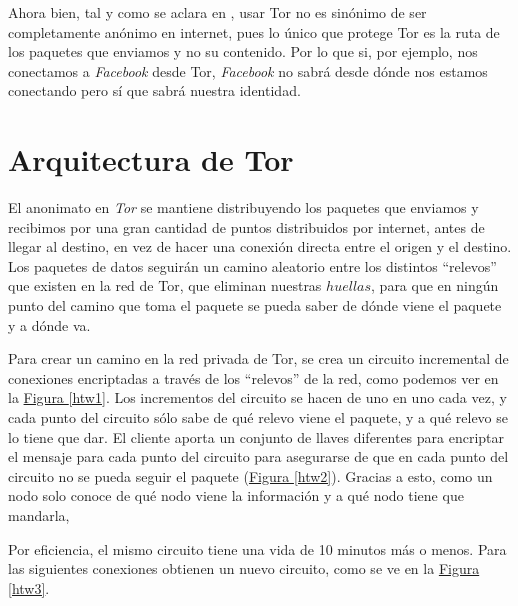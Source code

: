 \documentclass[10pt,a4paper,spanish]{article}
\begin{document}
Ahora bien, tal y como se aclara en \cite{anonymoustor}, usar Tor no es sinónimo de ser completamente anónimo en internet, pues lo único que protege Tor es la ruta de los paquetes que enviamos y no su contenido. Por lo que si, por ejemplo, nos conectamos a \textit{Facebook} desde Tor, \textit{Facebook} no sabrá desde dónde nos estamos conectando pero sí que sabrá nuestra identidad.

\section{Arquitectura de Tor}

El anonimato en \textit{Tor} se mantiene distribuyendo los paquetes que enviamos y recibimos por una gran cantidad de puntos distribuidos por internet, antes de llegar al destino, en vez de hacer una conexión directa entre el origen y el destino. Los paquetes de datos seguirán un camino aleatorio entre los distintos ``relevos'' que existen en la red de Tor, que eliminan nuestras $huellas$, para que en ningún punto del camino que toma el paquete se pueda saber de dónde viene el paquete y a dónde va.

Para crear un camino en la red privada de Tor, se crea un circuito incremental de conexiones encriptadas a través de los ``relevos'' de la red, como podemos ver en la \hyperref[htw1]{Figura \ref*{htw1}}. Los incrementos del circuito se hacen de uno en uno cada vez, y cada punto del circuito sólo sabe de qué relevo viene el paquete, y a qué relevo se lo tiene que dar. El cliente aporta un conjunto de llaves diferentes para encriptar el mensaje para cada punto del circuito para asegurarse de que en cada punto del circuito no se pueda seguir el paquete (\hyperref[htw2]{Figura \ref*{htw2}}). Gracias a esto, como un nodo solo conoce de qué nodo viene la información y a qué nodo tiene que mandarla, 

Por eficiencia, el mismo circuito tiene una vida de 10 minutos más o menos. Para las siguientes conexiones obtienen un nuevo circuito, como se ve en la \hyperref[htw3]{Figura \ref*{htw3}}.
\end{document}
